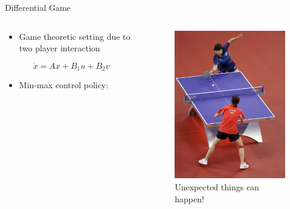 \documentclass[handout]{beamer}
\begin{document}
%
\begin{frame}{Differential Game}
\begin{columns}
\begin{column}{.49\textwidth}
\begin{itemize}
\item Game theoretic setting due to two player interaction
\end{itemize}
\begin{equation}
\dot{x} = A x + B_1 u + B_2 v
\end{equation}
\begin{itemize}
\item Min-max control policy:
\end{itemize}
\end{column}
\begin{column}{.49\textwidth}
\begin{figure}
\center
\includegraphics[scale=2.0]{table-tennis.jpg}
\caption{Unexpected things can happen!}
\end{figure}
\end{column}
\end{columns}
\end{frame}
%
\end{document}
